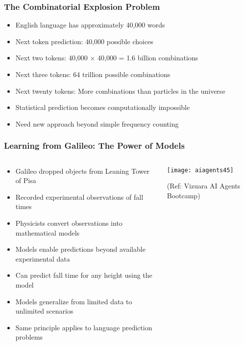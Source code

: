 \begin{frame}[fragile]\frametitle{The Combinatorial Explosion Problem}
      \begin{itemize}
	  \item English language has approximately 40,000 words
	  \item Next token prediction: 40,000 possible choices
	  \item Next two tokens: 40,000 × 40,000 = 1.6 billion combinations
	  \item Next three tokens: 64 trillion possible combinations
	  \item Next twenty tokens: More combinations than particles in the universe
	  \item Statistical prediction becomes computationally impossible
	  \item Need new approach beyond simple frequency counting
	  \end{itemize}
\end{frame}

\begin{frame}[fragile]\frametitle{Learning from Galileo: The Power of Models}

\begin{columns}
    \begin{column}[T]{0.6\linewidth}
      \begin{itemize}
	  \item Galileo dropped objects from Leaning Tower of Pisa
	  \item Recorded experimental observations of fall times
	  \item Physicists convert observations into mathematical models
	  \item Models enable predictions beyond available experimental data
	  \item Can predict fall time for any height using the model
	  \item Models generalize from limited data to unlimited scenarios
	  \item Same principle applies to language prediction problems
	  \end{itemize}

    \end{column}
    \begin{column}[T]{0.4\linewidth}
		\begin{center}
		\texttt{[image: aiagents45]}

		{\tiny (Ref: Vizuara AI Agents Bootcamp)}

		\end{center}	
    \end{column}
  \end{columns}
  
 
\end{frame}

